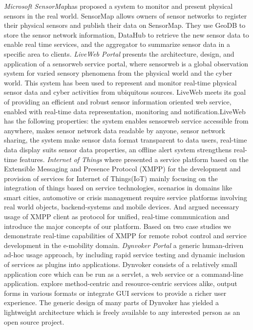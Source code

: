 \newline
	\emph{Microsoft SensorMap\cite{nath2007sensormap}}has proposed a system to monitor and present physical sensors in the real world. SensorMap allows owners of sensor networks to register their physical sensors and publish their data on SensorMap. They use GeoDB to store the sensor network information, DataHub to retrieve the new sensor data to enable real time services, and the aggregator to summarize sensor data in a specific area to clients.
\newline
	 \emph{LiveWeb Portal}\cite{yang2011liveweb} presents the architecture, design, and application of a sensorweb service portal, where sensorweb is a global observation system for varied sensory phenomena from the physical world and the cyber world. This system has been used to represent and monitor real-time physical sensor data and cyber activities from ubiquitous sources. LiveWeb meets its goal of providing an efficient and robust sensor information oriented web service, enabled with real-time data representation, monitoring and notification.LiveWeb has the following properties: the system enables sensorweb service accessible from anywhere, makes sensor network data readable by anyone, sensor network sharing, the system make sensor data format transparent to data users, real-time data display suits sensor data properties, an offline alert system strengthens real-time features.
\newline
	\emph{Internet of Things}\cite{bendel2013service} where presented a service platform based on the Extensible Messaging and Presence Protocol (XMPP) for the development and provision of services for Internet of Things(IoT) mainly focusing on the integration of things based on service technologies, scenarios in domains like smart cities, automotive or crisis management require service
	platforms involving real world objects, backend-systems and mobile devices. And argued necessary usage of
    XMPP client as protocol for unified, real-time communication and introduce the major concepts of our platform. Based on two case studies we demonstrate real-time capabilities of XMPP for remote robot control and service development in the e-mobility domain.
 \newline
	 \emph{Dynvoker Portal}\cite{spillner2008ad} a generic human-driven ad-hoc usage approach, by including rapid service testing and dynamic inclusion of services as plugins into applications. Dynvoker consists of a relatively small application core which can be run as a servlet, a web service or a command-line application. explore method-centric and resource-centric services alike, output forms in various formats or integrate GUI services to provide a richer user experience. The generic design of many parts of Dynvoker has yielded a lightweight architecture which is freely available to any interested person as an open source project.
